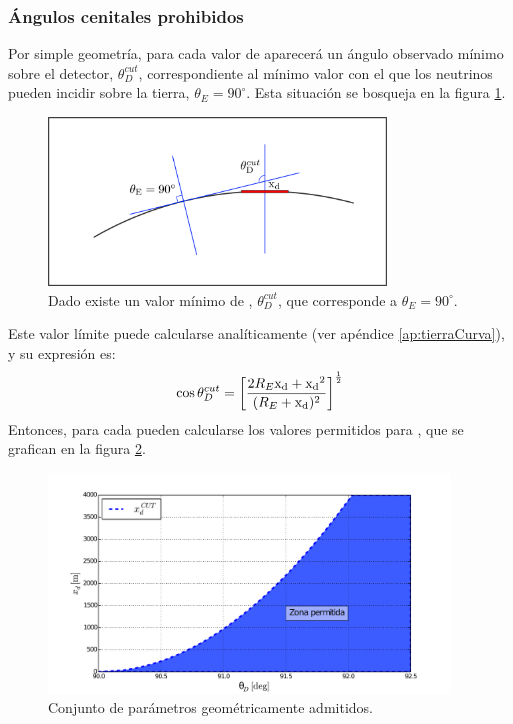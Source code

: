 	\subsubsection{\'Angulos cenitales prohibidos}
	Por simple geometr\'ia, para cada valor de \xd{} aparecer\'a un \'angulo observado m\'inimo sobre el detector, $\theta_D^{cut}$, correspondiente al m\'inimo valor con el que los neutrinos pueden incidir sobre la tierra, $\theta_E=90^\circ$.
	Esta situaci\'on se bosqueja en la figura \ref{fig:curveEarthSketch_thCut0}.
	\begin{figure}[ht!]
		\centering
		\includegraphics[width=0.8\textwidth]{./fig/appendix/curveEarthSketch_thCut.pdf}
		\caption{\label{fig:curveEarthSketch_thCut0}
		Dado \xd{} existe un valor m\'inimo de \td{}, $\theta_D^{cut}$, que corresponde a $\theta_E=90^\circ$.
		}
	\end{figure}
	Este valor l\'imite puede calcularse anal\'iticamente (ver ap\'endice \ref{ap:tierraCurva}), y su expresi\'on es:
	\begin{equation}
	\cos \theta_D^{cut} = \left[ \frac{2 R_E {\rm x_d}+{\rm x_d}^2}{(R_E+{\rm x_d})^2} \right]^{\frac{1}{2}}
	\label{eq:tdc0}
	\end{equation}
	Entonces, para cada \xd{} pueden calcularse los valores permitidos para \td{}, que se grafican en la figura \ref{fig:dx_thcut0}.
	\begin{figure}[ht!]
		\centering
		\includegraphics[width=0.95\textwidth]{./fig/appendix/thetaDCut_mod}
		\caption{\label{fig:dx_thcut0}
		Conjunto de par\'ametros geom\'etricamente admitidos.
		}
	\end{figure}
